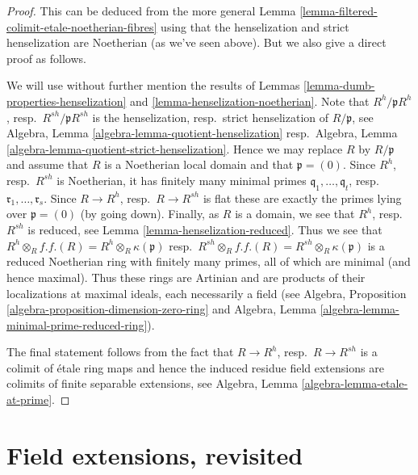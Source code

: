 \begin{proof}
This can be deduced from the more general
Lemma \ref{lemma-filtered-colimit-etale-noetherian-fibres}
using that the henselization and strict henselization are Noetherian
(as we've seen above). But we also give a direct proof as follows.

\medskip\noindent
We will use without further mention the results of
Lemmas \ref{lemma-dumb-properties-henselization} and
\ref{lemma-henselization-noetherian}.
Note that $R^h/\mathfrak pR^h$, resp.\ $R^{sh}/\mathfrak pR^{sh}$
is the henselization, resp.\ strict henselization of $R/\mathfrak p$,
see Algebra, Lemma \ref{algebra-lemma-quotient-henselization}
resp.\ Algebra, Lemma \ref{algebra-lemma-quotient-strict-henselization}.
Hence we may replace $R$ by $R/\mathfrak p$ and assume that $R$
is a Noetherian local domain and that $\mathfrak p = (0)$.
Since $R^h$, resp.\ $R^{sh}$ is Noetherian, it has finitely many
minimal primes $\mathfrak q_1, \ldots, \mathfrak q_t$,
resp.\ $\mathfrak r_1, \ldots, \mathfrak r_s$.
Since $R \to R^h$, resp.\ $R \to R^{sh}$ is flat these are exactly
the primes lying over $\mathfrak p = (0)$ (by going down).
Finally, as $R$ is a domain, we see that $R^h$, resp.\ $R^{sh}$
is reduced, see Lemma \ref{lemma-henselization-reduced}.
Thus we see that $R^h \otimes_R f.f.(R) = R^h \otimes_R \kappa(\mathfrak p)$
resp.\ $R^{sh} \otimes_R f.f.(R) = R^{sh} \otimes_R \kappa(\mathfrak p)$
is a reduced Noetherian ring with finitely many primes, all of which
are minimal (and hence maximal). Thus these rings are Artinian and are
products of their localizations at maximal ideals, each necessarily a field
(see Algebra, Proposition \ref{algebra-proposition-dimension-zero-ring} and
Algebra, Lemma \ref{algebra-lemma-minimal-prime-reduced-ring}).

\medskip\noindent
The final statement follows from the fact that $R \to R^h$,
resp.\ $R \to R^{sh}$ is a colimit of \'etale ring maps and hence
the induced residue field extensions are colimits of finite separable
extensions, see
Algebra, Lemma \ref{algebra-lemma-etale-at-prime}.
\end{proof}









\section{Field extensions, revisited}
\label{section-p-bases}

